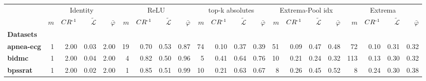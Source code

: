 \begin{tabular}{l|rrrr|rrrr|rrrr|rrrr|rrrr}
	\toprule
	{} & \multicolumn{4}{c}{Identity} & \multicolumn{4}{c}{ReLU} & \multicolumn{4}{c}{top-k absolutes} & \multicolumn{4}{c}{Extrema-Pool idx} & \multicolumn{4}{c}{Extrema} \\
	{} &      $m$ & $CR\textsuperscript{-1}$ & $\tilde{\mathcal{L}}$ & $\bar\varphi$ &  $m$ & $CR\textsuperscript{-1}$ & $\tilde{\mathcal{L}}$ & $\bar\varphi$ &             $m$ & $CR\textsuperscript{-1}$ & $\tilde{\mathcal{L}}$ & $\bar\varphi$ &              $m$ & $CR\textsuperscript{-1}$ & $\tilde{\mathcal{L}}$ & $\bar\varphi$ &     $m$ & $CR\textsuperscript{-1}$ & $\tilde{\mathcal{L}}$ & $\bar\varphi$ \\
	\textbf{Datasets     } &          &                          &                       &               &      &                          &                       &               &                 &                          &                       &               &                  &                          &                       &               &         &                          &                       &               \\
	\midrule
	\textbf{apnea-ecg    } &        1 &                     2.00 &                  0.03 &          2.00 &   19 &                     0.70 &                  0.53 &          0.87 &              74 &                     0.10 &                  0.37 &          0.39 &               51 &                     0.09 &                  0.47 &          0.48 &      72 &                     0.10 &                  0.31 &          0.32 \\
	\textbf{bidmc        } &        1 &                     2.00 &                  0.04 &          2.00 &    4 &                     0.82 &                  0.50 &          0.96 &               5 &                     0.41 &                  0.64 &          0.76 &               10 &                     0.21 &                  0.24 &          0.32 &     113 &                     0.13 &                  0.30 &          0.32 \\
	\textbf{bpssrat      } &        1 &                     2.00 &                  0.02 &          2.00 &    1 &                     0.85 &                  0.51 &          0.99 &              10 &                     0.21 &                  0.63 &          0.67 &                8 &                     0.26 &                  0.45 &          0.52 &       8 &                     0.24 &                  0.30 &          0.38 \\

\end{tabular}
